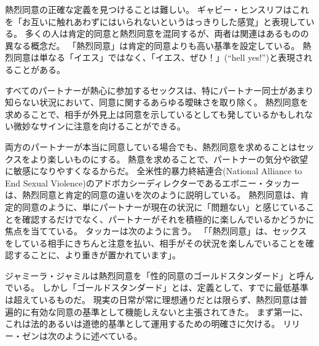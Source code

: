 \documentclass[paper=a4,book,openany]{jlreq}
\newcommand{\ig}[1]{}           %
\begin{document}
熱烈同意の正確な定義を見つけることは難しい。
ギャビー・ヒンスリフ\ig{Gaby Hinsliff}はこれを「お互いに触れあわずにはいられないというはっきりした感覚」と表現している\citep{hinsliff15:_consen_is_not_enoug}。
多くの人は肯定的同意と熱烈同意を混同するが、両者は関連はあるものの異なる概念だ。
「熱烈同意」は肯定的同意よりも高い基準を設定している。
熱烈同意は単なる「イエス」ではなく、「イエス、ぜひ！」(``hell yes!'')と表現されることがある。

すべてのパートナーが熱心に参加するセックスは、特にパートナー同士があまり知らない状況において、同意に関するあらゆる曖昧さを取り除く。
熱烈同意を求めることで、相手が外見上は同意を示しているとしても発しているかもしれない微妙なサインに注意を向けることができる。

両方のパートナーが本当に同意している場合でも、熱烈同意を求めることはセックスをより楽しいものにする。
熱意を求めることで、パートナーの気分や欲望に敏感になりやすくなるからだ。
全米性的暴力終結連合(National Alliance to End Sexual Violence)のアドボカシーディレクターであるエボニー・タッカー\ig{Ebony Tucker}は、熱烈同意と肯定的同意の違いを次のように説明している。
熱烈同意は、肯定的同意のように、単にパートナーが現在の状況に「問題ない」と感じていることを確認するだけでなく、パートナーがそれを積極的に楽しんでいるかどうかに焦点を当てている。
タッカーは次のように言う。
「「熱烈同意」は、セックスをしている相手にきちんと注意を払い、相手がその状況を楽しんでいることを確認することに、より重きが置かれています」\citep{cooney18:_aziz_ansar_alleg_has_peopl}。

ジャミーラ・ジャミル\ig{Jameela Jamil}は熱烈同意を「性的同意のゴールドスタンダード」と呼んでいる\citep{jamil18:_what_we_need_learn_aziz_ansar_clust}。
しかし「ゴールドスタンダード」とは、定義として、すでに最低基準は超えているものだ。
現実の日常が常に理想通りだとは限らず、熱烈同意は普遍的に有効な同意の基準として機能しえないと主張されてきた。
まず第一に、これは法的あるいは道徳的基準として運用するための明確さに欠ける。
リリー・ゼン\ig{Lily Zheng}は次のように述べている。
\end{document}
